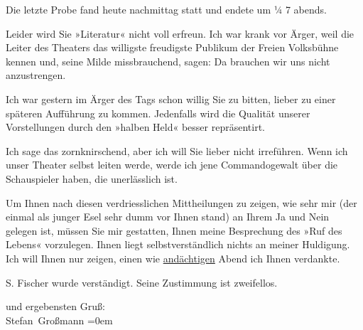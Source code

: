 \pstart
           Die letzte Probe fand heute nachmittag statt und endete um ¼ 7
               abends.\pend
           
\pstart
           Leider wird Sie »Literatur« nicht voll erfreun.
               Ich war krank vor Ärger, weil die Leiter des Theaters das willigste  freudigste Publikum der Freien Volksbühne kennen und, seine Milde missbrauchend, sagen: Da
               brauchen wir uns nicht anzustrengen.\pend
           
\pstart
           {\pb}Ich war gestern im Ärger des Tags schon
               willig Sie zu bitten, lieber zu einer späteren Aufführung zu kommen. Jedenfalls wird
               die Qualität unserer Vorstellungen durch den »halben
                  Held« besser repräsentirt.\pend
           
\pstart
           Ich sage das zornknirschend, aber ich will Sie lieber nicht irreführen. Wenn ich
               unser Theater selbst leiten werde, werde ich jene {\pb}Commandogewalt über die Schauspieler haben,
               die unerlässlich ist.\pend
           
\pstart
           Um Ihnen nach diesen verdriesslichen Mittheilungen zu zeigen, wie sehr mir (der
               einmal als junger Esel sehr dumm vor Ihnen stand) an Ihrem Ja und Nein gelegen ist,
               müssen Sie mir gestatten, Ihnen meine Besprechung des »Ruf des
                  Lebens« vorzulegen. Ihnen liegt selbstverständlich nichts an {\pb}meiner Huldigung. Ich will Ihnen nur zeigen,
               einen wie \uline{andächtigen} Abend ich Ihnen verdankte.\pend
           
\pstart
           S. Fischer wurde verständigt. Seine Zustimmung
               ist zweifellos.\pend
           
\pstart
            und ergebensten Gruß:{\\[\baselineskip]}\spacefill\mbox{Stefan Großmann}\pend
           \leftskip=0em{}\endnumbering{}  
      